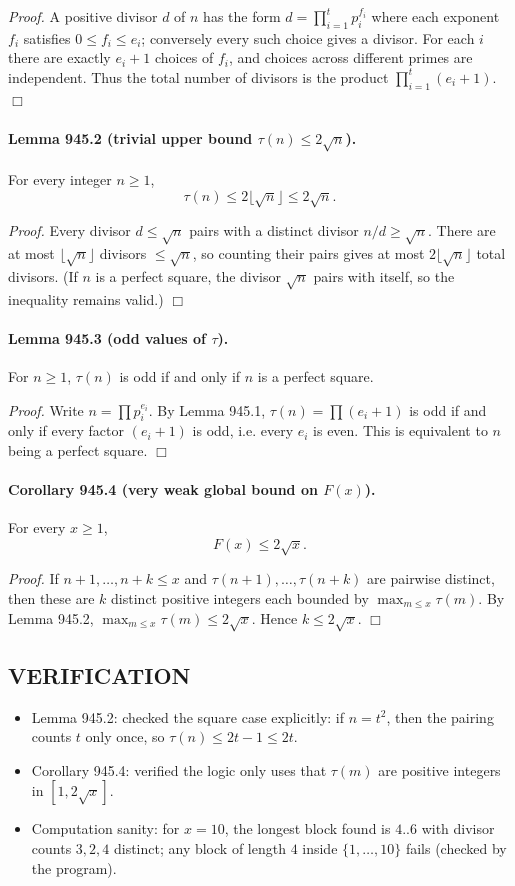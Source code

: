 \emph{Proof.}
A positive divisor $d$ of $n$ has the form $d=\prod_{i=1}^t p_i^{f_i}$ where each exponent $f_i$ satisfies $0\le f_i\le e_i$; conversely every such choice gives a divisor.
For each $i$ there are exactly $e_i+1$ choices of $f_i$, and choices across different primes are independent. Thus the total number of divisors is the product $\prod_{i=1}^t (e_i+1)$.
\hfill $\Box$

\paragraph{Lemma 945.2 (trivial upper bound $\tau(n)\le 2\sqrt{n}$).}
For every integer $n\ge 1$,
\[
\tau(n)\le 2\lfloor \sqrt{n}\rfloor \le 2\sqrt{n}.
\]

\emph{Proof.}
Every divisor $d\le \sqrt{n}$ pairs with a distinct divisor $n/d\ge \sqrt{n}$. There are at most $\lfloor\sqrt{n}\rfloor$ divisors $\le \sqrt{n}$, so counting their pairs gives at most $2\lfloor\sqrt{n}\rfloor$ total divisors. (If $n$ is a perfect square, the divisor $\sqrt{n}$ pairs with itself, so the inequality remains valid.)
\hfill $\Box$

\paragraph{Lemma 945.3 (odd values of $\tau$).}
For $n\ge 1$, $\tau(n)$ is odd if and only if $n$ is a perfect square.

\emph{Proof.}
Write $n=\prod p_i^{e_i}$. By Lemma 945.1, $\tau(n)=\prod (e_i+1)$ is odd if and only if every factor $(e_i+1)$ is odd, i.e. every $e_i$ is even. This is equivalent to $n$ being a perfect square.
\hfill $\Box$

\paragraph{Corollary 945.4 (very weak global bound on $F(x)$).}
For every $x\ge 1$,
\[
F(x) \le 2\sqrt{x}.
\]

\emph{Proof.}
If $n+1,\dots,n+k\le x$ and $\tau(n+1),\dots,\tau(n+k)$ are pairwise distinct, then these are $k$ distinct positive integers each bounded by $\max_{m\le x}\tau(m)$. By Lemma 945.2, $\max_{m\le x}\tau(m)\le 2\sqrt{x}$. Hence $k\le 2\sqrt{x}$.
\hfill $\Box$

\subsection*{VERIFICATION}
\begin{itemize}
\item Lemma 945.2: checked the square case explicitly: if $n=t^2$, then the pairing counts $t$ only once, so $\tau(n)\le 2t-1\le 2t$.
\item Corollary 945.4: verified the logic only uses that $\tau(m)$ are positive integers in $[1,2\sqrt{x}]$.
\item Computation sanity: for $x=10$, the longest block found is $4..6$ with divisor counts $3,2,4$ distinct; any block of length $4$ inside $\{1,\dots,10\}$ fails (checked by the program).
\end{itemize}

